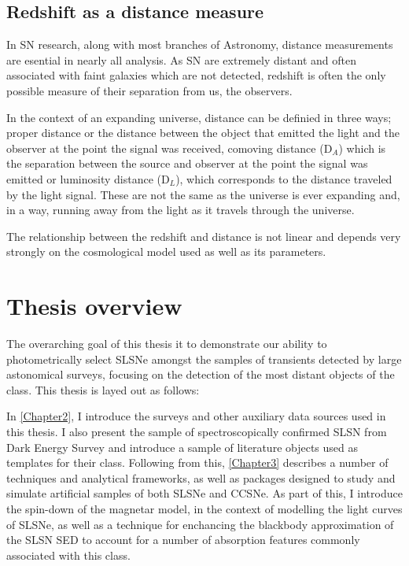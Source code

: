 \subsection{Redshift as a distance measure}
In SN research, along with most branches of Astronomy, distance measurements are esential in nearly all analysis. As SN are extremely distant and often associated with faint galaxies which are not detected, redshift is often the only possible measure of their separation from us, the observers.

In the context of an expanding universe, distance can be definied in three ways; proper distance or the distance between the object that emitted the light and the observer at the point the signal was received, comoving distance (D$_A$) which is the separation between the source and observer at the point the signal was emitted or luminosity distance (D$_L$), which corresponds to the distance traveled by the light signal. These are not the same as the universe is ever expanding and, in a way, running away from the light as it travels through the universe.

The relationship between the redshift and distance is not linear and depends very strongly on the cosmological model used as well as its parameters.


\section{Thesis overview}
The overarching goal of this thesis it to demonstrate our ability to photometrically select SLSNe amongst the samples of transients detected by large astonomical surveys, focusing on the detection of the most distant objects of the class. This thesis is layed out as follows:

In \cref{Chapter2}, I introduce the surveys and other auxiliary data sources used in this thesis. I also present the sample of spectroscopically confirmed SLSN from Dark Energy Survey and introduce a sample of literature objects used as templates for their class. Following from this, \cref{Chapter3} describes a number of techniques and analytical frameworks, as well as packages designed to study and simulate artificial samples of both SLSNe and CCSNe. As part of this, I introduce the spin-down of the magnetar model, in the context of modelling the light curves of SLSNe, as well as a technique for enchancing the blackbody approximation of the SLSN SED to account for a number of absorption features commonly associated with this class.

